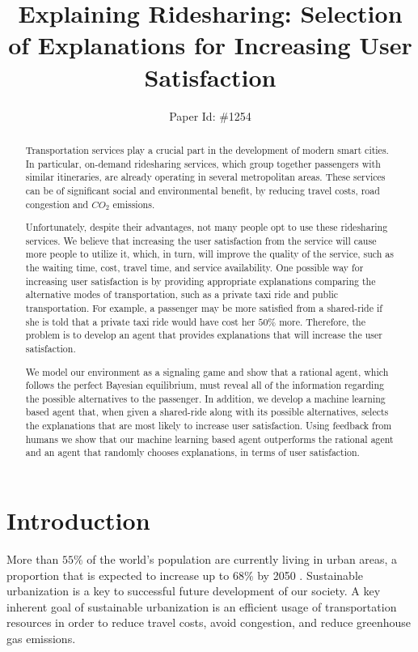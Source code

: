 \documentclass[letterpaper]{article} %
\title{Explaining Ridesharing: Selection of Explanations for Increasing User Satisfaction}
\author{Paper Id: \#1254}
\begin{document}
\maketitle
\begin{abstract}
Transportation services play a crucial part in the development of modern smart cities.
In particular, on-demand ridesharing services, which group together passengers with similar itineraries, are already operating in several metropolitan areas.
These services can be of significant social and environmental benefit, by reducing travel costs, road congestion and $CO_2$ emissions.

Unfortunately, despite their advantages, not many people opt to use these ridesharing services. We believe that increasing the user satisfaction from the service will cause more people to utilize it, which, in turn, will improve the quality of the service, such as the waiting time, cost, travel time, and service availability. One possible way for increasing user satisfaction is by providing appropriate explanations comparing the alternative modes of transportation, such as a private taxi ride and public transportation. For example, a passenger may be more satisfied from a shared-ride if she is told that a private taxi ride would have cost her $50\%$ more. Therefore, the problem is to develop an agent that provides explanations that will increase the user satisfaction.

We model our environment as a signaling game and show that a rational agent, which follows the perfect Bayesian equilibrium, must reveal all of the information regarding the possible alternatives to the passenger.
In addition, we develop a machine learning based agent that, when given a shared-ride along with its possible alternatives, selects the explanations that are most likely to increase user satisfaction.
Using feedback from humans we show that our machine learning based agent outperforms the rational agent and an agent that randomly chooses explanations, in terms of user satisfaction.
\end{abstract}


\section{Introduction}
More than $55\%$ of the world’s population are currently living in urban areas, a proportion that is expected to increase up to $68\%$ by 2050 \cite{united2018}. Sustainable urbanization is a key to successful future development of our society. A key inherent goal of sustainable urbanization is an efficient usage of transportation resources in order to reduce travel costs, avoid congestion, and reduce greenhouse gas emissions.
\end{document}
